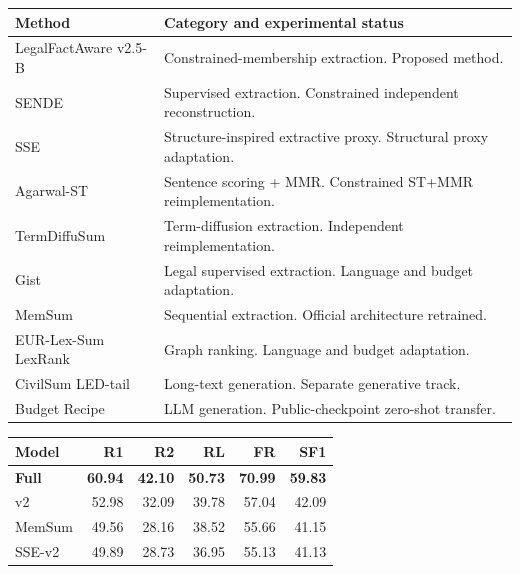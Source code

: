 \documentclass[10pt,twocolumn,letterpaper]{article}
\begin{document}
\par\medskip\noindent\begin{minipage}{\columnwidth}
\label{tab:6}
\begin{tabularx}{\columnwidth}{@{}>{\raggedright\arraybackslash}p{}>{\raggedright\arraybackslash}X@{}}
\toprule
\textbf{Method} & \textbf{Category and experimental status} \\
\midrule
LegalFactAware v2.5-B & Constrained-membership extraction. Proposed method. \\
SENDE & Supervised extraction. Constrained independent reconstruction. \\
SSE & Structure-inspired extractive proxy. Structural proxy adaptation. \\
Agarwal-ST & Sentence scoring + MMR. Constrained ST+MMR reimplementation. \\
TermDiffuSum & Term-diffusion extraction. Independent reimplementation. \\
Gist & Legal supervised extraction. Language and budget adaptation. \\
MemSum & Sequential extraction. Official architecture retrained. \\
EUR-Lex-Sum LexRank & Graph ranking. Language and budget adaptation. \\
CivilSum LED-tail & Long-text generation. Separate generative track. \\
Budget Recipe & LLM generation. Public-checkpoint zero-shot transfer. \\
\bottomrule
\end{tabularx}
\end{minipage}\par\smallskip

\par\medskip\noindent\begin{minipage}{\columnwidth}
\label{tab:7}
\begin{tabular*}{\columnwidth}{@{\extracolsep{\fill}}lrrrrr@{}}
\toprule
\textbf{Model} & \textbf{R1} & \textbf{R2} & \textbf{RL} & \textbf{FR} & \textbf{SF1} \\
\midrule
\textbf{Full} & \textbf{60.94} & \textbf{42.10} & \textbf{50.73} & \textbf{70.99} & \textbf{59.83} \\
v2 & 52.98 & 32.09 & 39.78 & 57.04 & 42.09 \\
MemSum & 49.56 & 28.16 & 38.52 & 55.66 & 41.15 \\
SSE-v2 & 49.89 & 28.73 & 36.95 & 55.13 & 41.13 \\
\bottomrule
\end{tabular*}
\end{minipage}\par\smallskip
\end{document}
